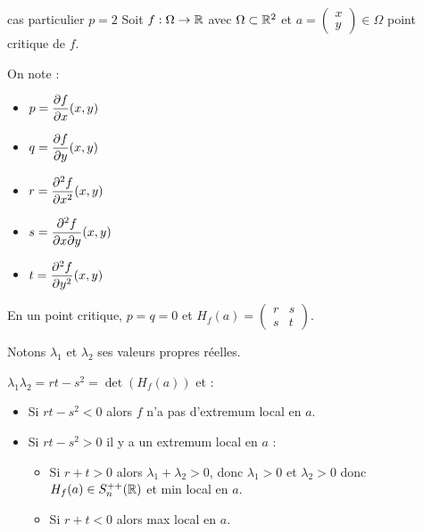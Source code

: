 \begin{proposition}{cas particulier $p=2$}{}
    Soit $f : \Omega \to \mathbb{R}$ avec $\Omega \subset \mathbb{R}^2$ et 
    $a = \begin{pmatrix}
        x \\
        y
    \end{pmatrix} \in \Omega$ point critique de $f$.

    On note : 
    \begin{itemize}
        \item $\displaystyle p = \frac{\partial f}{\partial x} (x, y)$
        \item $\displaystyle q = \frac{\partial f}{\partial y} (x, y)$
        \item $\displaystyle r = \frac{\partial^{2} f}{\partial x^{2}} (x, y)$
        \item $\displaystyle s = \frac{\partial^2 f}{\partial x \partial y} (x, y)$
        \item $\displaystyle t = \frac{\partial^{2} f}{\partial y^{2}} (x, y)$
    \end{itemize}

    En un point critique, $p = q = 0$ et $H_f(a) = \begin{pmatrix}
        r & s \\
        s & t
    \end{pmatrix}$.

    Notons $\lambda_1$ et $\lambda_2$ ses valeurs propres réelles. 

    $\lambda_1 \lambda_2 = rt - s^2= \det (H_f(a))$ et : 

    \begin{itemize}
        \item Si $rt - s^2 < 0$ alors $f$ n'a pas d'extremum local en $a$.
        \item Si $rt - s^2 > 0$ il y a un extremum local en $a$ :
        \begin{itemize}
            \item Si $r + t > 0$ alors $\lambda_1 + \lambda_2 > 0$, donc $\lambda_1 > 0$ et $\lambda_2 > 0$ donc $H_f(a) \in S_n^{++}(\mathbb{R})$ et min local en $a$.
            \item Si $r + t < 0$ alors max local en $a$.
        \end{itemize}
    \end{itemize}
\end{proposition}